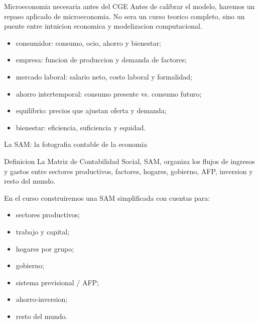 \documentclass[10pt,aspectratio=169]{beamer}
\begin{document}
\begin{frame}{Microeconomia necesaria antes del CGE}
\justifying
Antes de calibrar el modelo, haremos un repaso aplicado de microeconomia. No sera un curso teorico completo, sino un puente entre intuicion economica y modelizacion computacional.

\vspace{0.25cm}
\begin{itemize}
  \item consumidor: consumo, ocio, ahorro y bienestar;
  \item empresa: funcion de produccion y demanda de factores;
  \item mercado laboral: salario neto, costo laboral y formalidad;
  \item ahorro intertemporal: consumo presente vs. consumo futuro;
  \item equilibrio: precios que ajustan oferta y demanda;
  \item bienestar: eficiencia, suficiencia y equidad.
\end{itemize}
\end{frame}

\begin{frame}{La SAM: la fotografia contable de la economia}
\begin{block}{Definicion}
La Matriz de Contabilidad Social, SAM, organiza los flujos de ingresos y gastos entre sectores productivos, factores, hogares, gobierno, AFP, inversion y resto del mundo.
\end{block}

\vspace{0.2cm}
En el curso construiremos una SAM simplificada con cuentas para:
\begin{itemize}
  \item sectores productivos;
  \item trabajo y capital;
  \item hogares por grupo;
  \item gobierno;
  \item sistema previsional / AFP;
  \item ahorro-inversion;
  \item resto del mundo.
\end{itemize}
\end{frame}
\end{document}
